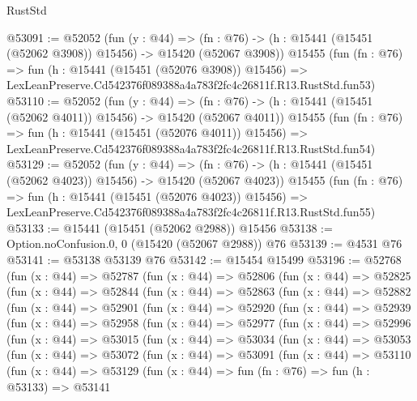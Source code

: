 \begin{lexlean}{RustStd}
\begin{coremodule}
@53091 := @52052
    (fun (y : @44) =>
    (fn : @76) -> (h : @15441 (@15451 (@52062 @3908)) @15456) -> @15420 (@52067 @3908))
    @15455
    (fun (fn : @76) =>
    fun (h : @15441 (@15451 (@52076 @3908)) @15456) =>
    LexLeanPreserve.Cd542376f089388a4a783f2fc4c26811f.R13.RustStd.fun53)
@53110 := @52052
    (fun (y : @44) =>
    (fn : @76) -> (h : @15441 (@15451 (@52062 @4011)) @15456) -> @15420 (@52067 @4011))
    @15455
    (fun (fn : @76) =>
    fun (h : @15441 (@15451 (@52076 @4011)) @15456) =>
    LexLeanPreserve.Cd542376f089388a4a783f2fc4c26811f.R13.RustStd.fun54)
@53129 := @52052
    (fun (y : @44) =>
    (fn : @76) -> (h : @15441 (@15451 (@52062 @4023)) @15456) -> @15420 (@52067 @4023))
    @15455
    (fun (fn : @76) =>
    fun (h : @15441 (@15451 (@52076 @4023)) @15456) =>
    LexLeanPreserve.Cd542376f089388a4a783f2fc4c26811f.R13.RustStd.fun55)
@53133 := @15441 (@15451 (@52062 @2988)) @15456
@53138 := Option.noConfusion.{0, 0} (@15420 (@52067 @2988)) @76
@53139 := @4531 @76
@53141 := @53138 @53139 @76
@53142 := @15454 @15499
@53196 := @52768
    (fun (x : @44) =>
    @52787
      (fun (x : @44) =>
      @52806
        (fun (x : @44) =>
        @52825
          (fun (x : @44) =>
          @52844
            (fun (x : @44) =>
            @52863
              (fun (x : @44) =>
              @52882
                (fun (x : @44) =>
                @52901
                  (fun (x : @44) =>
                  @52920
                    (fun (x : @44) =>
                    @52939
                      (fun (x : @44) =>
                      @52958
                        (fun (x : @44) =>
                        @52977
                          (fun (x : @44) =>
                          @52996
                            (fun (x : @44) =>
                            @53015
                              (fun (x : @44) =>
                              @53034
                                (fun (x : @44) =>
                                @53053
                                  (fun (x : @44) =>
                                  @53072
                                    (fun (x : @44) =>
                                    @53091
                                      (fun (x : @44) =>
                                      @53110
                                        (fun (x : @44) =>
                                        @53129
                                          (fun (x : @44) =>
                                          fun (fn : @76) =>
                                          fun (h : @53133) =>
                                          @53141

\end{coremodule}
\end{lexlean}
